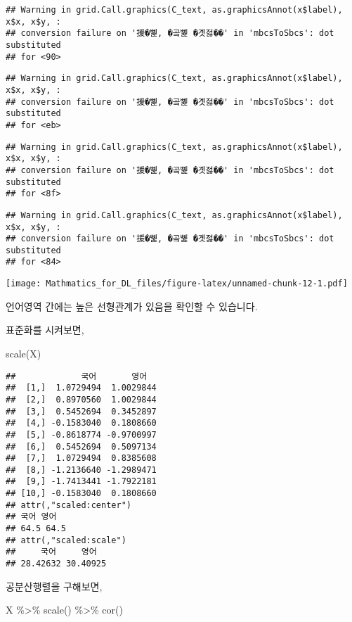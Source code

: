 \documentclass[
]{article}
\newenvironment{Shaded}{\begin{snugshade}}{\end{snugshade}}
\newcommand{\FunctionTok}[1]{\textcolor[rgb]{0.00,0.00,0.00}{#1}}
\newcommand{\NormalTok}[1]{#1}
\newcommand{\SpecialCharTok}[1]{\textcolor[rgb]{0.00,0.00,0.00}{#1}}
\begin{document}
\begin{verbatim}
## Warning in grid.Call.graphics(C_text, as.graphicsAnnot(x$label), x$x, x$y, :
## conversion failure on '援�뼱, �곸뼱 �곗젏��' in 'mbcsToSbcs': dot substituted
## for <90>
\end{verbatim}

\begin{verbatim}
## Warning in grid.Call.graphics(C_text, as.graphicsAnnot(x$label), x$x, x$y, :
## conversion failure on '援�뼱, �곸뼱 �곗젏��' in 'mbcsToSbcs': dot substituted
## for <eb>
\end{verbatim}

\begin{verbatim}
## Warning in grid.Call.graphics(C_text, as.graphicsAnnot(x$label), x$x, x$y, :
## conversion failure on '援�뼱, �곸뼱 �곗젏��' in 'mbcsToSbcs': dot substituted
## for <8f>
\end{verbatim}

\begin{verbatim}
## Warning in grid.Call.graphics(C_text, as.graphicsAnnot(x$label), x$x, x$y, :
## conversion failure on '援�뼱, �곸뼱 �곗젏��' in 'mbcsToSbcs': dot substituted
## for <84>
\end{verbatim}

\texttt{[image: Mathmatics\_for\_DL\_files/figure-latex/unnamed-chunk-12-1.pdf]}

언어영역 간에는 높은 선형관계가 있음을 확인할 수 있습니다.

표준화를 시켜보면,

\begin{Shaded}
\begin{Highlighting}[]
\FunctionTok{scale}\NormalTok{(X) }
\end{Highlighting}
\end{Shaded}

\begin{verbatim}
##             국어       영어
##  [1,]  1.0729494  1.0029844
##  [2,]  0.8970560  1.0029844
##  [3,]  0.5452694  0.3452897
##  [4,] -0.1583040  0.1808660
##  [5,] -0.8618774 -0.9700997
##  [6,]  0.5452694  0.5097134
##  [7,]  1.0729494  0.8385608
##  [8,] -1.2136640 -1.2989471
##  [9,] -1.7413441 -1.7922181
## [10,] -0.1583040  0.1808660
## attr(,"scaled:center")
## 국어 영어 
## 64.5 64.5 
## attr(,"scaled:scale")
##     국어     영어 
## 28.42632 30.40925
\end{verbatim}

공분산행렬을 구해보면,

\begin{Shaded}
\begin{Highlighting}[]
\NormalTok{X }\SpecialCharTok{\%\textgreater{}\%} \FunctionTok{scale}\NormalTok{() }\SpecialCharTok{\%\textgreater{}\%} \FunctionTok{cor}\NormalTok{()}
\end{Highlighting}
\end{Shaded}
\end{document}
